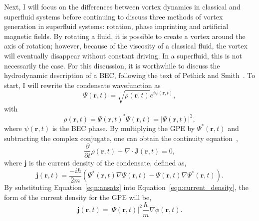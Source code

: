 Next, I will focus on the differences between vortex dynamics in classical and superfluid systems before continuing to discuss three methods of vortex generation in superfluid systems: rotation, phase imprinting and artificial magnetic fields.
By rotating a fluid, it is possible to create a vortex around the axis of rotation; however, because of the viscosity of a classical fluid, the vortex will eventually disappear without constant driving.
In a superfluid, this is not necessarily the case.
For this discussion, it is worthwhile to discuss the hydrodynamic description of a BEC, following the text of Pethick and Smith~\cite{pethick2002}.
To start, I will rewrite the condensate wavefunction as
\begin{equation}
\Psi(\mathbf{r},t) = \sqrt{\rho(\mathbf{r},t)}e^{i\psi(\mathbf{r},t)},
\label{eqn:ansatz}
\end{equation}
\noindent with
\begin{equation}
\rho(\mathbf{r},t)=\Psi(\mathbf{r},t)^*\Psi(\mathbf{r},t) = |\Psi(\mathbf{r},t)|^2,
\end{equation}
\noindent where $\psi(\mathbf{r},t)$ is the BEC phase.
By multiplying the GPE by $\Psi^*(\mathbf{r},t)$ and subtracting the complex conjugate, one can obtain the continuity equation~\cite{pethick2002},
\begin{equation}
\frac{\partial}{\partial t}\rho(\mathbf{r},t)+\nabla\cdot\mathbf{J}(\mathbf{r},t) = 0,
\end{equation}
\noindent where $\mathbf{j}$ is the current density of the condensate, defined as,
\begin{equation}
\mathbf{j}(\mathbf{r},t) = \frac{-i\hbar}{2m}\left( \Psi^*(\mathbf{r},t)\nabla\Psi(\mathbf{r},t)- \Psi(\mathbf{r},t)\nabla\Psi^*(\mathbf{r},t)\right).
\label{eqn:current_density}
\end{equation}
By substituting Equation~\eqref{eqn:ansatz} into Equation~\eqref{eqn:current_density}, the form of the current density for the GPE will be,
\begin{equation}
\mathbf{j}(\mathbf{r},t) = |\Psi(\mathbf{r},t)|^2\frac{\hbar}{m}\nabla\phi(\mathbf{r},t).
\end{equation}

